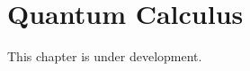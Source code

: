 \section{Quantum Calculus}
\begin{remark*}[Status]
This chapter is under development.
\end{remark*}
